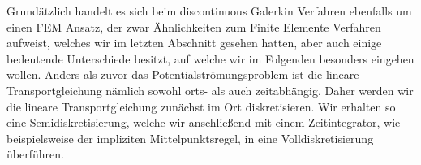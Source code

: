 Grundätzlich handelt es sich beim discontinuous Galerkin Verfahren ebenfalls um einen FEM Ansatz, der zwar Ähnlichkeiten zum Finite Elemente Verfahren aufweist, welches wir im letzten Abschnitt gesehen hatten, aber auch einige bedeutende Unterschiede besitzt, auf welche wir im Folgenden besonders eingehen wollen. 
Anders als zuvor das Potentialströmungsproblem ist die lineare Transportgleichung  nämlich sowohl orts- als auch zeitabhängig. Daher werden wir
  die lineare Transportgleichung zunächst im Ort diskretisieren. Wir erhalten so eine Semidiskretisierung, welche wir anschließend mit einem Zeitintegrator, wie beispielsweise der impliziten Mittelpunktsregel, in eine Volldiskretisierung überführen.
 

